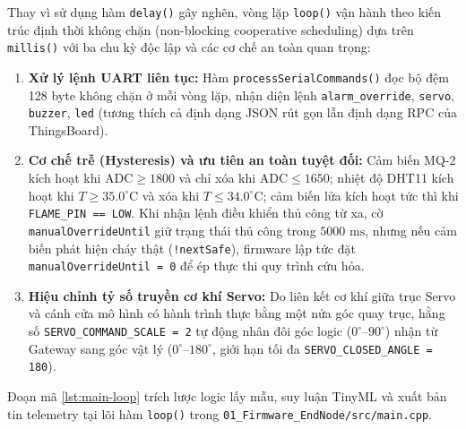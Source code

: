 Thay vì sử dụng hàm \texttt{delay()} gây nghẽn, vòng lặp \texttt{loop()} vận hành theo kiến trúc định thời không chặn (non-blocking cooperative scheduling) dựa trên \texttt{millis()} với ba chu kỳ độc lập và các cơ chế an toàn quan trọng:
\begin{enumerate}[leftmargin=*, itemsep=2pt]
  \item \textbf{Xử lý lệnh UART liên tục:} Hàm \texttt{processSerialCommands()} đọc bộ đệm 128 byte không chặn ở mỗi vòng lặp, nhận diện lệnh \texttt{alarm\_override}, \texttt{servo}, \texttt{buzzer}, \texttt{led} (tương thích cả định dạng JSON rút gọn lẫn định dạng RPC của ThingsBoard).
  \item \textbf{Cơ chế trễ (Hysteresis) và ưu tiên an toàn tuyệt đối:} Cảm biến MQ-2 kích hoạt khi $\text{ADC} \ge 1800$ và chỉ xóa khi $\text{ADC} \le 1650$; nhiệt độ DHT11 kích hoạt khi $T \ge 35.0^\circ\text{C}$ và xóa khi $T \le 34.0^\circ\text{C}$; cảm biến lửa kích hoạt tức thì khi \texttt{FLAME\_PIN == LOW}. Khi nhận lệnh điều khiển thủ công từ xa, cờ \texttt{manualOverrideUntil} giữ trạng thái thủ công trong $5000\text{ ms}$, nhưng nếu cảm biến phát hiện cháy thật (\texttt{!nextSafe}), firmware lập tức đặt \texttt{manualOverrideUntil = 0} để ép thực thi quy trình cứu hỏa.
  \item \textbf{Hiệu chỉnh tỷ số truyền cơ khí Servo:} Do liên kết cơ khí giữa trục Servo và cánh cửa mô hình có hành trình thực bằng một nửa góc quay trục, hằng số \texttt{SERVO\_COMMAND\_SCALE = 2} tự động nhân đôi góc logic ($0^\circ$--$90^\circ$) nhận từ Gateway sang góc vật lý ($0^\circ$--$180^\circ$, giới hạn tối đa \texttt{SERVO\_CLOSED\_ANGLE = 180}).
\end{enumerate}

Đoạn mã \ref{lst:main-loop} trích lược logic lấy mẫu, suy luận TinyML và xuất bản tin telemetry tại lõi hàm \texttt{loop()} trong \texttt{01\_Firmware\_EndNode/src/main.cpp}.

